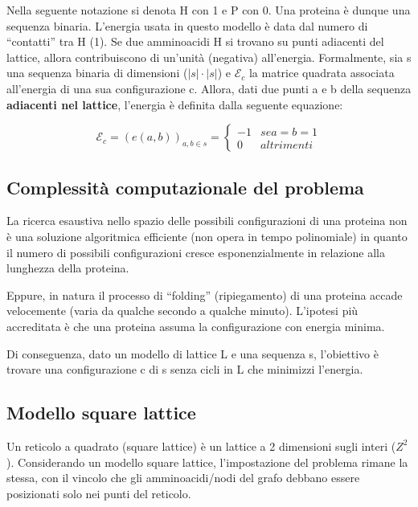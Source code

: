 \documentclass[conference]{IEEEtran}
\begin{document}
Nella seguente notazione si denota H con 1 e P con 0. Una proteina è dunque una sequenza binaria. L'energia usata in questo modello è data dal numero di ``contatti'' tra H (1). Se due amminoacidi H si trovano su punti adiacenti del lattice, allora contribuiscono di un'unità (negativa) all'energia.
Formalmente, sia s una sequenza binaria di dimensioni ($|s|\cdot|s|$) e $\mathcal{E}_c$ la matrice quadrata associata all'energia di una sua configurazione c. Allora, dati due punti a e b della sequenza \textbf{adiacenti nel lattice}, l'energia è definita dalla seguente equazione:

\begin{equation}
    \mathcal{E}_c = (e(a,b))_{a,b \in s} =
    \begin{cases*}
      -1 & se a = b = 1 \\
      0  & altrimenti
    \end{cases*}
\end{equation}

\subsection{Complessità computazionale del problema}

La ricerca esaustiva nello spazio delle possibili configurazioni di una proteina non è una soluzione algoritmica efficiente (non opera in tempo polinomiale) in quanto il numero di possibili configurazioni cresce esponenzialmente in relazione alla lunghezza della proteina.

Eppure, in natura il processo di ``folding'' (ripiegamento) di una proteina accade velocemente (varia da qualche secondo a qualche minuto). L'ipotesi più accreditata è che una proteina assuma la configurazione con energia minima.

Di conseguenza, dato un modello di lattice L e una sequenza s, l'obiettivo è trovare una configurazione c di s senza cicli in L che minimizzi l'energia.

\subsection{Modello square lattice}

Un reticolo a quadrato (square lattice) è un lattice a 2 dimensioni sugli interi ($Z^2$). Considerando un modello square lattice, l'impostazione del problema rimane la stessa, con il vincolo che gli amminoacidi/nodi del grafo debbano essere posizionati solo nei punti del reticolo.
\end{document}
